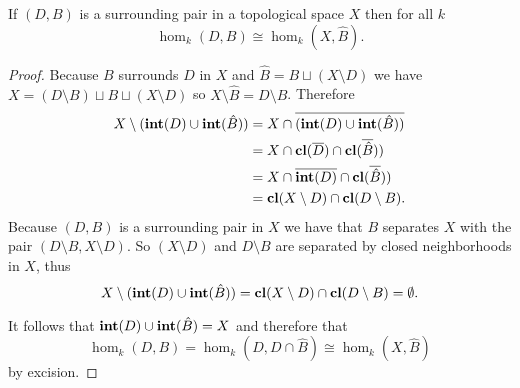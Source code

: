 \begin{lemma}\label{lem:extension_iso}
  If $(D, B)$ is a surrounding pair in a topological space $X$ then for all $k$
  \[ \hom_k(D, B)\cong \hom_k(X, \hat{B}).\]
\end{lemma}
\begin{proof}
  Because $B$ surrounds $D$ in $X$ and $\hat{B} = B\sqcup (X\setminus D)$ we have $X = (D\setminus B)\sqcup B\sqcup (X\setminus D)$ so $X\setminus \hat{B} = D\setminus B$.
  Therefore
  \begin{align*}
    X\setminus (\mathbf{int}(D)\cup\mathbf{int}(\hat{B})) &= X\cap \overline{(\mathbf{int}(D)\cup\mathbf{int}(\hat{B}))}\\
      &= X\cap \mathbf{cl}(\overline{D})\cap\mathbf{cl}(\overline{\hat{B}})) \\
      &= X\cap \overline{\mathbf{int}(D)}\cap\mathbf{cl}(\overline{\hat{B}})) \\
      &= \mathbf{cl}(X\setminus D)\cap \mathbf{cl}(D\setminus B).
  \end{align*}
  Because $(D, B)$ is a surrounding pair in $X$ we have that $B$ separates $X$ with the pair $(D\setminus B, X\setminus D)$.
  So $(X\setminus D)$ and $D\setminus B$ are separated by closed neighborhoods in $X$, thus
  \[ X\setminus (\mathbf{int}(D)\cup\mathbf{int}(\hat{B})) = \mathbf{cl}(X\setminus D)\cap \mathbf{cl}(D\setminus B) = \emptyset.\]

  It follows that $\mathbf{int}(D)\cup\mathbf{int}(\hat{B}) = X$ and therefore that
  \[ \hom_k(D, B) = \hom_k(D, D\cap \hat{B}) \cong \hom_k(X, \hat{B})\]
  by excision.
\end{proof}


